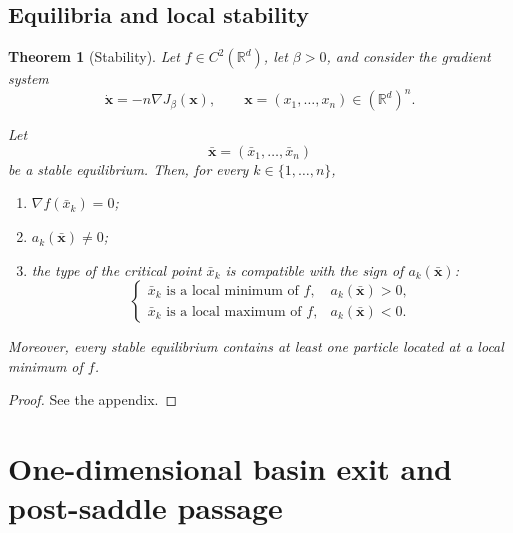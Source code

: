 \documentclass{article}
\theoremstyle{plain}
\newtheorem{theorem}{Theorem}[section]
\theoremstyle{definition}
\theoremstyle{remark}
\begin{document}
\subsection{Equilibria and local stability}
\label{sec:stationary-points}

\begin{theorem}[Stability]
\label{thm:stable-stationary-points}
Let \(f\in C^2(\mathbb R^d)\), let \(\beta>0\), and consider the
gradient system
\[
    \dot{\mathbf x} = -n\nabla J_\beta(\mathbf x), \qquad \mathbf x=(x_1,\ldots,x_n)\in(\mathbb R^d)^n.
\]

Let
\[
    \bar{\mathbf x} = (\bar x_1,\ldots,\bar x_n)
\]
be a  stable equilibrium. Then, for every \(k\in\{1,\ldots,n\}\),

\begin{enumerate}
    \item \(\nabla f(\bar x_k)=0\);
    \item \(a_k(\bar{\mathbf x})\neq0\);
    \item the type of the critical point \(\bar x_k\) is compatible with the sign of \(a_k(\bar{\mathbf x})\):
    \[
        \begin{cases}
        \bar x_k \text{ is a local minimum of }f, & a_k(\bar{\mathbf x})>0,\\[1mm]
        \bar x_k \text{ is a local maximum of }f, & a_k(\bar{\mathbf x})<0.
        \end{cases}
    \]
\end{enumerate}
Moreover, every stable equilibrium contains at least one particle located at a local minimum of \(f\).
\end{theorem}
\begin{proof}
    See the appendix.
\end{proof}

\section{One-dimensional basin exit and post-saddle passage}
\label{sec:one-dimensional-passage}

\end{document}
